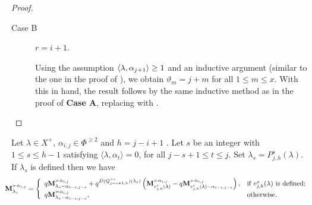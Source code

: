 \begin{proof}
\begin{description}
\item[Case B]  $r=i+1 $. 

Using the assumption $\langle \lambda , \alpha_{j+1} \rangle\ge 1$ and an inductive argument (similar to the one in the proof of ), we obtain $\vartheta_m=j+m$ for all $1\le m\le x$.
With this in hand, the result follows by the same inductive method as in the proof of \textbf{Case A}, replacing  with .
\end{description}
\end{proof}





\begin{corollary}\rm \label{lem: v existe o no existe}
    Let $\lambda\in X^{+}$,  $\alpha_{i,j}\in \Phi^{\geq 2}$ and $h=j-i+1$ .  
    Let $s$ be an integer with $1 \leq s \leq h-1$ satisfying  $\langle \lambda , \alpha_t \rangle  = 0$, for all $j-s+1\leq t \leq j$. 
    Set $\lambda_{s} = P^s_{j,h}(\lambda)$.
   If $\lambda_{s}$ is defined then we have
    \begin{equation}\label{eq: v existe o no existe}
        \hspace{-10pt}\bfM_{\lambda_{s}}^{\succ \alpha_{i,j}} = \left\{\begin{array}{ll}
        q\bfM_{\lambda_{s}-\alpha_{i-s,j-s}}^{\succ \alpha_{i,j}} + q^{D(Q^{-s}_{j-s+1,h})(\lambda_{s})}\left(\bfM_{v^s_{j,h}(\lambda)}^{\succ \alpha_{i,j}} - q\bfM_{v^s_{j,h}(\lambda)-\alpha_{i-s,j-s}}^{\succ \alpha_{i,j}}\right), & \mbox{if } v^s_{j,h}(\lambda) \mbox{ is defined};\\
        q\bfM_{\lambda_{s}-\alpha_{i-s,j-s}}^{\succ\alpha_{i,j}},  & \mbox{otherwise}.
        \end{array}\right.
    \end{equation}    
\end{corollary}


